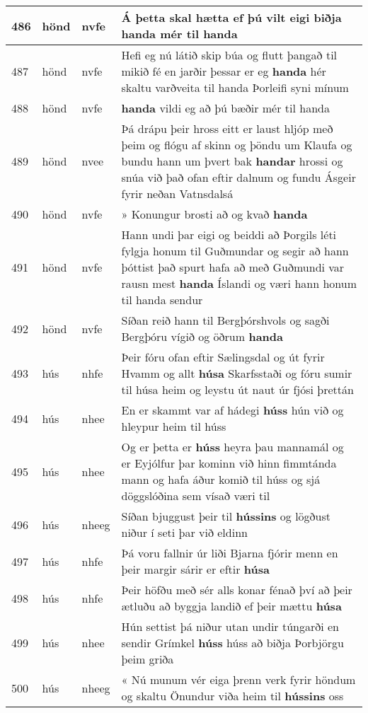\documentclass{article}
\begin{document}
\begin{longtable}{p{1cm}|p{1cm}|p{1cm}|p{13cm}}
\hline
486&hönd&nvfe&Á þetta skal hætta ef þú vilt eigi biðja \textbf{handa} mér til handa\\
\hline
487&hönd&nvfe&Hefi eg nú látið skip búa og flutt þangað til mikið fé en jarðir þessar er eg \textbf{handa} hér skaltu varðveita til handa Þorleifi syni mínum\\
\hline
488&hönd&nvfe& \textbf{handa} vildi eg að þú bæðir mér til handa\\
\hline
489&hönd&nvee&Þá drápu þeir hross eitt er laust hljóp með þeim og flógu af skinn og þöndu um Klaufa og bundu hann um þvert bak \textbf{handar} hrossi og snúa við það ofan eftir dalnum og fundu Ásgeir fyrir neðan Vatnsdalsá\\
\hline
490&hönd&nvfe&» Konungur brosti að og kvað \textbf{handa} \\
\hline
491&hönd&nvfe&Hann undi þar eigi og beiddi að Þorgils léti fylgja honum til Guðmundar og segir að hann þóttist það spurt hafa að með Guðmundi var rausn mest \textbf{handa} Íslandi og væri hann honum til handa sendur\\
\hline
492&hönd&nvfe&Síðan reið hann til Bergþórshvols og sagði Bergþóru vígið og öðrum \textbf{handa} \\
\hline
493&hús&nhfe&Þeir fóru ofan eftir Sælingsdal og út fyrir Hvamm og allt \textbf{húsa} Skarfsstaði og fóru sumir til húsa heim og leystu út naut úr fjósi þrettán\\
\hline
494&hús&nhee&En er skammt var af hádegi \textbf{húss} hún við og hleypur heim til húss\\
\hline
495&hús&nhee&Og er þetta er \textbf{húss} heyra þau mannamál og er Eyjólfur þar kominn við hinn fimmtánda mann og hafa áður komið til húss og sjá döggslóðina sem vísað væri til\\
\hline
496&hús&nheeg&Síðan bjuggust þeir til \textbf{hússins} og lögðust niður í seti þar við eldinn\\
\hline
497&hús&nhfe&Þá voru fallnir úr liði Bjarna fjórir menn en þeir margir sárir er eftir \textbf{húsa} \\
\hline
498&hús&nhfe&Þeir höfðu með sér alls konar fénað því að þeir ætluðu að byggja landið ef þeir mættu \textbf{húsa} \\
\hline
499&hús&nhee&Hún settist þá niður utan undir túngarði en sendir Grímkel \textbf{húss} húss að biðja Þorbjörgu þeim griða\\
\hline
500&hús&nheeg&« Nú munum vér eiga þrenn verk fyrir höndum og skaltu Önundur viða heim til \textbf{hússins} oss\\

\end{longtable}
\end{document}
